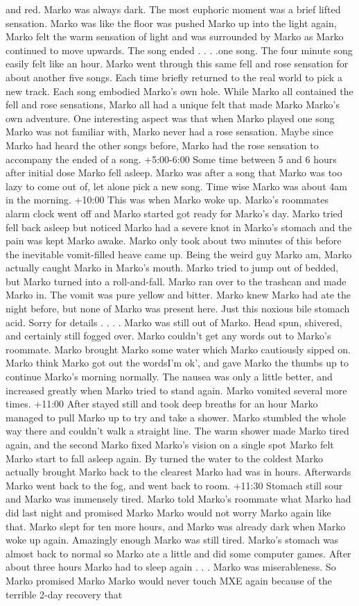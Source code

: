 \documentclass[12pt]{book}
\begin{document}
and red. Marko was always dark. The most euphoric moment was a brief lifted sensation. Marko was like the floor was pushed Marko up into the light again, Marko felt the warm sensation of light and was surrounded by Marko as Marko continued to move upwards. The song ended . . .  .one song. The four minute song easily felt like an hour. Marko went through this same fell and rose sensation for about another five songs. Each time briefly returned to the real world to pick a new track. Each song embodied Marko's own hole. While Marko all contained the fell and rose sensations, Marko all had a unique felt that made Marko Marko's own adventure. One interesting aspect was that when Marko played one song Marko was not familiar with, Marko never had a rose sensation. Maybe since Marko had heard the other songs before, Marko had the rose sensation to accompany the ended of a song. +5:00-6:00 Some time between 5 and 6 hours after initial dose Marko fell asleep. Marko was after a song that Marko was too lazy to come out of, let alone pick a new song. Time wise Marko was about 4am in the morning. +10:00 This was when Marko woke up. Marko's roommates alarm clock went off and Marko started got ready for Marko's day. Marko tried fell back asleep but noticed Marko had a severe knot in Marko's stomach and the pain was kept Marko awake. Marko only took about two minutes of this before the inevitable vomit-filled heave came up. Being the weird guy Marko am, Marko actually caught Marko in Marko's mouth. Marko tried to jump out of bedded, but Marko turned into a roll-and-fall. Marko ran over to the trashcan and made Marko in. The vomit was pure yellow and bitter. Marko knew Marko had ate the night before, but none of Marko was present here. Just this noxious bile stomach acid. Sorry for details . . .  . Marko was still out of Marko. Head spun, shivered, and certainly still fogged over. Marko couldn't get any words out to Marko's roommate. Marko brought Marko some water which Marko cautiously sipped on. Marko think Marko got out the wordsI'm ok', and gave Marko the thumbs up to continue Marko's morning normally. The nausea was only a little better, and increased greatly when Marko tried to stand again. Marko vomited several more times. +11:00 After stayed still and took deep breaths for an hour Marko managed to pull Marko up to try and take a shower. Marko stumbled the whole way there and couldn't walk a straight line. The warm shower made Marko tired again, and the second Marko fixed Marko's vision on a single spot Marko felt Marko start to fall asleep again. By turned the water to the coldest Marko actually brought Marko back to the clearest Marko had was in hours. Afterwards Marko went back to the fog, and went back to room. +11:30 Stomach still sour and Marko was immensely tired. Marko told Marko's roommate what Marko had did last night and promised Marko Marko would not worry Marko again like that. Marko slept for ten more hours, and Marko was already dark when Marko woke up again. Amazingly enough Marko was still tired. Marko's stomach was almost back to normal so Marko ate a little and did some computer games. After about three hours Marko had to sleep again . . .  Marko was miserableness. So Marko promised Marko Marko would never touch MXE again because of the terrible 2-day recovery that 
\end{document}
